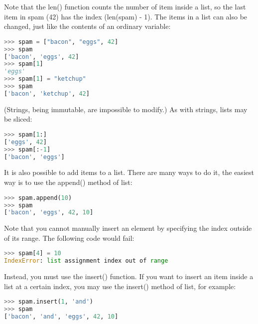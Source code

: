 Note that the len() function counts the number of item inside a list, so the
last item in spam (42) has the index (len(spam) - 1).  The items in a list can
also be changed, just like the contents of an ordinary variable:
\lstset{basicstyle=\scriptsize, numbers=left, captionpos=b, tabsize=4}
\begin{lstlisting}[caption=List access,language={Python},
xleftmargin=15pt, label=lst:listaccess]
>>> spam = ["bacon", "eggs", 42]
>>> spam
['bacon', 'eggs', 42]
>>> spam[1]
'eggs'
>>> spam[1] = "ketchup"
>>> spam
['bacon', 'ketchup', 42]
\end{lstlisting}

(Strings, being immutable, are impossible to modify.) As with strings, lists may be sliced:
\lstset{basicstyle=\scriptsize, numbers=left, captionpos=b, tabsize=4}
\begin{lstlisting}[caption=List Slice 1,language={Python},
xleftmargin=15pt, label=lst:listslice1]
>>> spam[1:]
['eggs', 42]
>>> spam[:-1]
['bacon', 'eggs']
\end{lstlisting}

It is also possible to add items to a list. There are many ways to do it, the
easiest way is to use the append() method of list:
\lstset{basicstyle=\scriptsize, numbers=left, captionpos=b, tabsize=4}
\begin{lstlisting}[caption=List append,language={Python},
xleftmargin=15pt, label=lst:listappend]
>>> spam.append(10)
>>> spam
['bacon', 'eggs', 42, 10]
\end{lstlisting}

Note that you cannot manually insert an element by specifying the index outside
of its range. The following code would fail:
\lstset{basicstyle=\scriptsize, numbers=left, captionpos=b, tabsize=4}
\begin{lstlisting}[caption=List out of bound,language={Python},
xleftmargin=15pt, label=lst:listoutofbound]
>>> spam[4] = 10
IndexError: list assignment index out of range
\end{lstlisting}

Instead, you must use the insert() function. If you want to insert an item
inside a list at a certain index, you may use the insert() method of list, for
example:
\lstset{basicstyle=\scriptsize, numbers=left, captionpos=b, tabsize=4}
\begin{lstlisting}[caption=List insert,language={Python},
xleftmargin=15pt, label=lst:listinsert]
>>> spam.insert(1, 'and')
>>> spam
['bacon', 'and', 'eggs', 42, 10]
\end{lstlisting}

